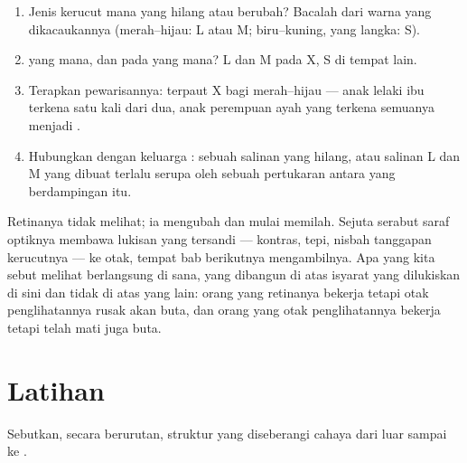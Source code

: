\begin{method}\label{met:g11:the-eye:case}
\begin{enumerate}
  \item Jenis kerucut mana yang hilang atau berubah? Bacalah dari warna
        yang dikacaukannya (merah--hijau: L atau M; biru--kuning, yang
        langka: S).
  \item {} yang mana, dan pada  yang mana? L dan M pada X, S
        di tempat lain.
  \item Terapkan pewarisannya:  terpaut X bagi merah--hijau ---
        anak lelaki ibu  terkena satu kali dari dua, anak
        perempuan ayah yang terkena semuanya menjadi .
  \item Hubungkan dengan keluarga : sebuah salinan yang hilang,
        atau salinan L dan M yang dibuat terlalu serupa oleh sebuah
        pertukaran antara  yang berdampingan itu.
\end{enumerate}
\end{method}

\begin{remark}\label{rem:g11:the-eye:tobrain}
Retinanya tidak melihat; ia mengubah dan mulai memilah. Sejuta serabut
saraf optiknya membawa lukisan yang tersandi --- kontras, tepi, nisbah
tanggapan kerucutnya --- ke otak, tempat bab berikutnya mengambilnya.
Apa yang kita sebut melihat berlangsung di sana, yang dibangun di atas
isyarat  yang dilukiskan di sini dan tidak di atas yang lain: orang
yang retinanya bekerja tetapi otak penglihatannya rusak akan buta, dan
orang yang otak penglihatannya bekerja tetapi  telah
mati juga buta.
\end{remark}

\section{Latihan}

\begin{exercise}[$\star$]\label{exo:g11:the-eye:1}
Sebutkan, secara berurutan, struktur yang diseberangi cahaya dari luar
sampai ke .
\end{exercise}

